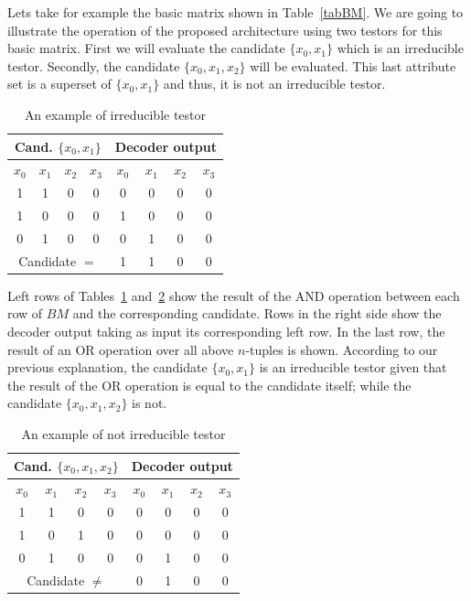 \documentclass[conference]{IEEEtran}
\begin{document}
Lets take for example the basic matrix shown in Table~\ref{tabBM}. We are going to illustrate the 
operation of the proposed architecture using two testors for this basic matrix. First we will evaluate 
the candidate $\{x_0,x_1\}$ which is an irreducible testor. Secondly, the candidate $\{x_0,x_1,x_2\}$ will 
be evaluated. This last attribute set is a superset of $\{x_0,x_1\}$ and thus, it is not an irreducible testor.


\begin{table}[htb]
	\renewcommand{\arraystretch}{1.3}
	\caption{An example of irreducible testor}
	\label{tabIrreducible}
	\centering
	\begin{tabular}{cccc|cccc}
	 	\hline                       
  		\multicolumn{4}{c|}{Cand. $\{x_0, x_1\}$} & 
  		\multicolumn{4}{c}{Decoder output} \\
  		\hline
		$x_0$ & $x_1$ & $x_2$ & $x_3$ &
  		$x_0$ & $x_1$ & $x_2$ & $x_3$\\
  		\hline
  		1 & 1 & 0 & 0 & 0 & 0 & 0 & 0\\
  		1 & 0 & 0 & 0 & 1 & 0 & 0 & 0\\
  		0 & 1 & 0 & 0 & 0 & 1 & 0 & 0\\
  		\hline  
  		\multicolumn{4}{c|}{Candidate $=$} & 1 & 1 & 0 & 0\\
  		\hline  
	\end{tabular}
\end{table}

		
Left rows of Tables~\ref{tabIrreducible} and~\ref{tabNotIrreducible} show the result of the AND operation between each row of $BM$ and the corresponding candidate. Rows in the right side show the decoder output taking as input its corresponding left row. In the last row, the result of an OR operation over all above $n$-tuples is shown. According to our previous explanation, the candidate $\{x_0,x_1\}$ is an irreducible testor given that the result of the OR operation is equal to the candidate itself; while the candidate $\{x_0,x_1,x_2\}$ is not.



\begin{table}[htb]
	\renewcommand{\arraystretch}{1.3}
	\caption{An example of not irreducible testor}
	\label{tabNotIrreducible}
	\centering
	\begin{tabular}{cccc|cccc}
	 	\hline                       
  		\multicolumn{4}{c|}{Cand. $\{x_0, x_1, x_2\}$} & 
  		\multicolumn{4}{c}{Decoder output} \\
  		\hline
		$x_0$ &  $x_1$ &   $x_2$ & $x_3$ &
  		$x_0$ &  $x_1$ &   $x_2$ & $x_3$  \\
  		\hline
  		1 & 1 & 0 & 0 & 0 & 0 & 0 & 0 \\
  		1 & 0 & 1 & 0 & 0 & 0 & 0 & 0 \\
  		0 & 1 & 0 & 0 & 0 & 1 & 0 & 0 \\
  		\hline  
  		\multicolumn{4}{c|}{Candidate $\neq$} & 0 & 1 & 0 & 0\\
  		\hline  
	\end{tabular}
\end{table}
\end{document}
